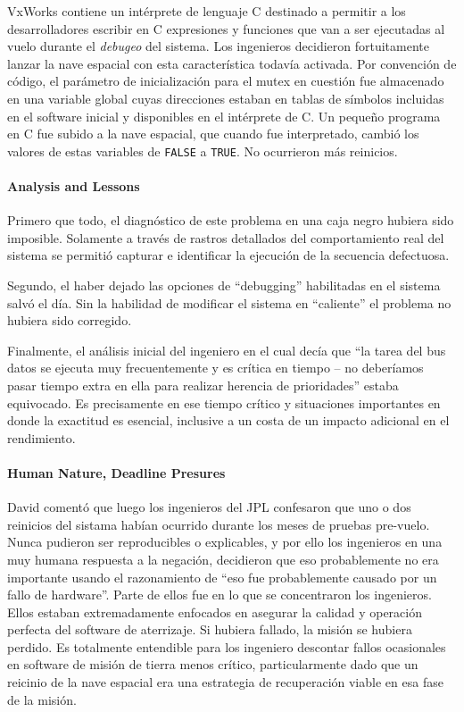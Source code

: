 VxWorks contiene un intérprete de lenguaje C destinado a permitir a los desarrolladores escribir en C expresiones y funciones que van a ser ejecutadas al vuelo durante el \textit{debugeo} del sistema. Los ingenieros decidieron fortuitamente lanzar la nave espacial con esta característica todavía activada. Por convención de código, el parámetro de inicialización para el mutex en cuestión fue almacenado en una variable global cuyas direcciones estaban en tablas de símbolos incluidas en el software inicial y disponibles en el intérprete de C. Un pequeño programa en C fue subido a la nave espacial, que cuando fue interpretado, cambió los valores de estas variables de \texttt{FALSE} a \texttt{TRUE}. No ocurrieron más reinicios.

\paragraph{\textnormal{\textbf{Analysis and Lessons}}}
Primero que todo, el diagnóstico de este problema en una caja negro hubiera sido imposible. Solamente a través de rastros detallados del comportamiento real del sistema se permitió capturar e identificar la ejecución de la secuencia defectuosa. 

Segundo, el haber dejado las opciones de ``debugging'' habilitadas en el sistema salvó el día. Sin la habilidad de modificar el sistema en ``caliente'' el problema no hubiera sido corregido.

Finalmente, el análisis inicial del ingeniero en el cual decía que ``la tarea del bus datos se ejecuta muy frecuentemente y es crítica en tiempo -- no deberíamos pasar tiempo extra en ella para realizar herencia de prioridades'' estaba equivocado. Es precisamente en ese tiempo crítico y situaciones importantes en donde la exactitud es esencial, inclusive a un costa de un impacto  adicional en el rendimiento.

\paragraph{\textnormal{\textbf{Human Nature, Deadline Presures}}}
David comentó que luego los ingenieros del JPL confesaron que uno o dos reinicios del sistama habían ocurrido durante los meses de pruebas pre-vuelo. Nunca pudieron ser reproducibles o explicables, y por ello los ingenieros en una muy humana respuesta a la negación, decidieron que eso probablemente no era importante usando el razonamiento de ``eso fue probablemente causado por un fallo de hardware''. Parte de ellos fue en lo que se concentraron los ingenieros. Ellos estaban extremadamente enfocados en asegurar la calidad y operación perfecta del software de aterrizaje. Si hubiera fallado, la misión se hubiera perdido. Es totalmente entendible para los ingeniero descontar fallos ocasionales en software de misión de tierra menos crítico, particularmente dado que un reicinio de la nave espacial era una estrategia de recuperación viable en esa fase de la misión.

